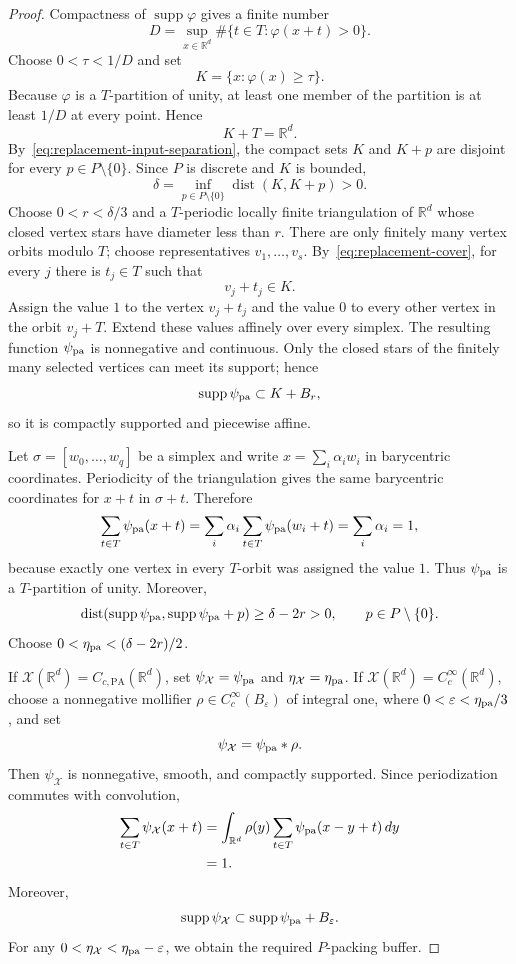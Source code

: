 \documentclass[11pt,reqno]{amsart}
\numberwithin{equation}{section}
\theoremstyle{definition}
\theoremstyle{remark}
\newcommand{\R}{\mathbb R}
\newcommand{\supp}{\operatorname{supp}}
\begin{document}
\begin{proof}
Compactness of $\supp\varphi$ gives a finite number
\[
 D=\sup_{x\in\R^d}\#\{t\in T:\varphi(x+t)>0\}.
\]
Choose $0<\tau<1/D$ and set
\[
 K=\{x:\varphi(x)\ge\tau\}.
\]
Because $\varphi$ is a $T$-partition of unity, at least one member of the
partition is at least $1/D$ at every point.  Hence
\begin{equation}\label{eq:replacement-cover}
 K+T=\R^d.
\end{equation}
By~\eqref{eq:replacement-input-separation}, the compact sets $K$ and $K+p$
are disjoint for every $p\in P\setminus\{0\}$.  Since $P$ is discrete and
$K$ is bounded,
\begin{equation}\label{eq:replacement-delta}
 \delta=\inf_{p\in P\setminus\{0\}}
 \operatorname{dist}(K,K+p)>0.
\end{equation}
Choose $0<r<\delta/3$ and a $T$-periodic locally finite triangulation of
$\R^d$ whose closed vertex stars have diameter less than $r$.  There are
only finitely many vertex orbits modulo $T$; choose representatives
$v_1,\ldots,v_s$.  By~\eqref{eq:replacement-cover}, for every $j$ there is
$t_j\in T$ such that
\[
 v_j+t_j\in K.
\]
Assign the value $1$ to the vertex $v_j+t_j$ and the value $0$ to every
other vertex in the orbit $v_j+T$.  Extend these values affinely over every
simplex.  The resulting function $\psi_{\rm pa}$ is nonnegative and
continuous.  Only the closed stars of the finitely many selected vertices
can meet its support; hence
\[
 \supp\psi_{\rm pa}\subset K+B_r,
\]
so it is compactly supported and piecewise affine.

Let $\sigma=[w_0,\ldots,w_q]$ be a simplex and write
$x=\sum_i\alpha_iw_i$ in barycentric coordinates.  Periodicity of the
triangulation gives the same barycentric coordinates for $x+t$ in
$\sigma+t$.  Therefore
\[
 \sum_{t\in T}\psi_{\rm pa}(x+t)
 =\sum_i\alpha_i\sum_{t\in T}\psi_{\rm pa}(w_i+t)
 =\sum_i\alpha_i=1,
\]
because exactly one vertex in every $T$-orbit was assigned the value $1$.
Thus $\psi_{\rm pa}$ is a $T$-partition of unity.  Moreover,
\[
 \operatorname{dist}(\supp\psi_{\rm pa},\supp\psi_{\rm pa}+p)
 \ge\delta-2r>0,
 \qquad p\in P\setminus\{0\}.
\]
Choose $0<\eta_{\rm pa}<(\delta-2r)/2$.

If $\mathcal X(\R^d)=C_{c,\mathrm{PA}}(\R^d)$, set
$\psi_{\mathcal X}=\psi_{\rm pa}$ and
$\eta_{\mathcal X}=\eta_{\rm pa}$.  If
$\mathcal X(\R^d)=C_c^\infty(\R^d)$, choose a nonnegative mollifier
$\rho\in C_c^\infty(B_\varepsilon)$ of integral one, where
$0<\varepsilon<\eta_{\rm pa}/3$, and set
\[
 \psi_{\mathcal X}=\psi_{\rm pa}*\rho.
\]
Then $\psi_{\mathcal X}$ is nonnegative, smooth, and compactly supported.
Since periodization commutes with convolution,
\begin{align*}
 \sum_{t\in T}\psi_{\mathcal X}(x+t)
 &=\int_{\R^d}\rho(y)
   \sum_{t\in T}\psi_{\rm pa}(x-y+t)\,dy\\
 &=1.
\end{align*}
Moreover,
\[
 \supp\psi_{\mathcal X}\subset\supp\psi_{\rm pa}+B_\varepsilon.
\]
For any $0<\eta_{\mathcal X}<\eta_{\rm pa}-\varepsilon$, we obtain the required
$P$-packing buffer.
\end{proof}
\end{document}

